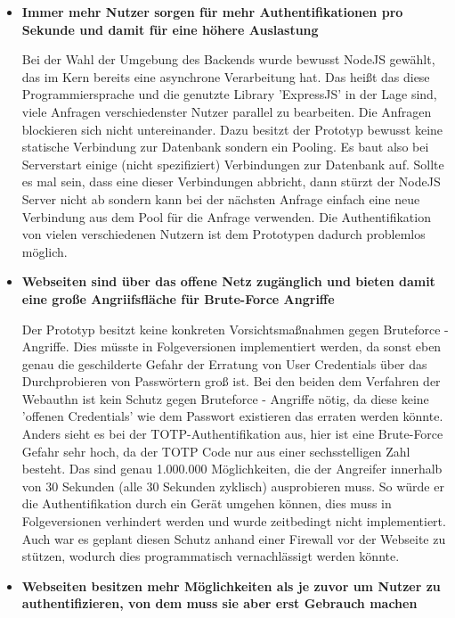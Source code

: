 \begin{itemize}
\item \textbf{Immer mehr Nutzer sorgen für mehr Authentifikationen pro Sekunde und damit für eine höhere Auslastung}

Bei der Wahl der Umgebung des Backends wurde bewusst NodeJS gewählt, das im Kern bereits eine asynchrone Verarbeitung hat. Das heißt das diese Programmiersprache und die genutzte Library 'ExpressJS' in der Lage sind, viele Anfragen verschiedenster Nutzer parallel zu bearbeiten. Die Anfragen blockieren sich nicht untereinander. Dazu besitzt der Prototyp bewusst keine statische Verbindung zur Datenbank sondern ein Pooling. Es baut also bei Serverstart einige (nicht spezifiziert) Verbindungen zur Datenbank auf. Sollte es mal sein, dass eine dieser Verbindungen abbricht, dann stürzt der NodeJS Server nicht ab sondern kann bei der nächsten Anfrage einfach eine neue Verbindung aus dem Pool für die Anfrage verwenden. Die Authentifikation von vielen verschiedenen Nutzern ist dem Prototypen dadurch problemlos möglich.

\item \textbf{Webseiten sind über das offene Netz zugänglich und bieten damit eine große Angriifsfläche für Brute-Force Angriffe}

Der Prototyp besitzt keine konkreten Vorsichtsmaßnahmen gegen Bruteforce - Angriffe. Dies müsste in Folgeversionen implementiert werden, da sonst eben genau die geschilderte Gefahr der Erratung von User Credentials über das Durchprobieren von Passwörtern groß ist. Bei den beiden dem Verfahren der Webauthn ist kein Schutz gegen Bruteforce - Angriffe nötig, da diese keine 'offenen Credentials' wie dem Passwort existieren das erraten werden könnte. Anders sieht es bei der TOTP-Authentifikation aus, hier ist eine Brute-Force Gefahr sehr hoch, da der TOTP Code nur aus einer sechsstelligen Zahl besteht. Das sind genau 1.000.000 Möglichkeiten, die der Angreifer innerhalb von 30 Sekunden (alle 30 Sekunden zyklisch) ausprobieren muss. So würde er die Authentifikation durch ein Gerät umgehen können, dies muss in Folgeversionen verhindert werden und wurde zeitbedingt nicht implementiert. Auch war es geplant diesen Schutz anhand einer Firewall vor der Webseite zu stützen, wodurch dies programmatisch vernachlässigt werden könnte.

\item \textbf{Webseiten besitzen mehr Möglichkeiten als je zuvor um Nutzer zu authentifizieren, von dem muss sie aber erst Gebrauch machen}


\end{itemize}
